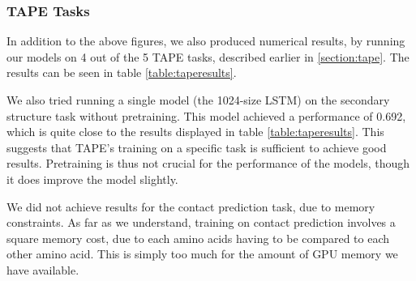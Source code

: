 \documentclass[a4paper,12pt]{article}
\begin{document}
\subsubsection{TAPE Tasks}
In addition to the above figures, we also produced numerical results, by running our models on 4 out of the 5 TAPE tasks, described earlier in \ref{section:tape}. The results can be seen in table \ref{table:taperesults}.

We also tried running a single model (the 1024-size LSTM) on the secondary structure task without pretraining. This model achieved a performance of 0.692, which is quite close to the results displayed in table \ref{table:taperesults}. This suggests that TAPE's training on a specific task is sufficient to achieve good results. Pretraining is thus not crucial for the performance of the models, though it does improve the model slightly.

We did not achieve results for the contact prediction task, due to memory constraints. As far as we understand, training on contact prediction involves a square memory cost, due to each amino acids having to be compared to each other amino acid. This is simply too much for the amount of GPU memory we have available.
\end{document}
